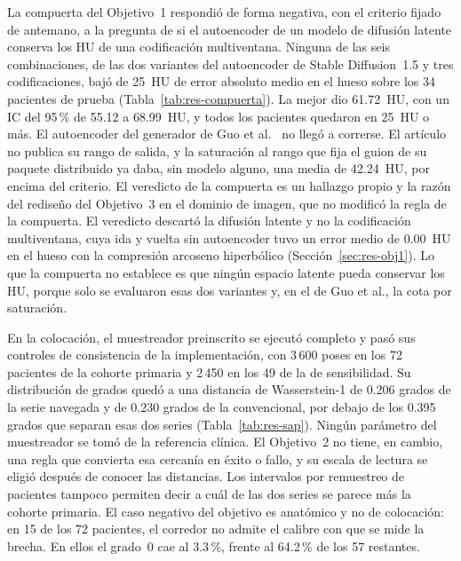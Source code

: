 La compuerta del Objetivo~1 respondió de forma negativa, con el criterio fijado de antemano, a la pregunta de si el autoencoder de un modelo de difusión latente conserva los HU de una codificación multiventana. Ninguna de las seis combinaciones, de las dos variantes del autoencoder de Stable Diffusion~1.5 y tres codificaciones, bajó de 25~HU de error absoluto medio en el hueso sobre los 34 pacientes de prueba (Tabla~\ref{tab:res-compuerta}). La mejor dio 61.72~HU, con un IC del 95\,\% de 55.12 a 68.99~HU, y todos los pacientes quedaron en 25~HU o más. El autoencoder del generador de Guo et al.~\cite{guo2025maisi} no llegó a correrse. El artículo no publica su rango de salida, y la saturación al rango que fija el guion de su paquete distribuido ya daba, sin modelo alguno, una media de 42.24~HU, por encima del criterio. El veredicto de la compuerta es un hallazgo propio y la razón del rediseño del Objetivo~3 en el dominio de imagen, que no modificó la regla de la compuerta. El veredicto descartó la difusión latente y no la codificación multiventana, cuya ida y vuelta sin autoencoder tuvo un error medio de 0.00~HU en el hueso con la compresión arcoseno hiperbólico (Sección~\ref{sec:res-obj1}). Lo que la compuerta no establece es que ningún espacio latente pueda conservar los HU, porque solo se evaluaron esas dos variantes y, en el de Guo et al., la cota por saturación.

En la colocación, el muestreador preinscrito se ejecutó completo y pasó sus controles de consistencia de la implementación, con 3\,600 poses en los 72 pacientes de la cohorte primaria y 2\,450 en los 49 de la de sensibilidad. Su distribución de grados quedó a una distancia de Wasserstein-1 de 0.206 grados de la serie navegada y de 0.230 grados de la convencional, por debajo de los 0.395 grados que separan esas dos series (Tabla~\ref{tab:res-sap}). Ningún parámetro del muestreador se tomó de la referencia clínica. El Objetivo~2 no tiene, en cambio, una regla que convierta esa cercanía en éxito o fallo, y su escala de lectura se eligió después de conocer las distancias. Los intervalos por remuestreo de pacientes tampoco permiten decir a cuál de las dos series se parece más la cohorte primaria. El caso negativo del objetivo es anatómico y no de colocación: en 15 de los 72 pacientes, el corredor no admite el calibre con que se mide la brecha. En ellos el grado~0 cae al 3.3\,\%, frente al 64.2\,\% de los 57 restantes.

